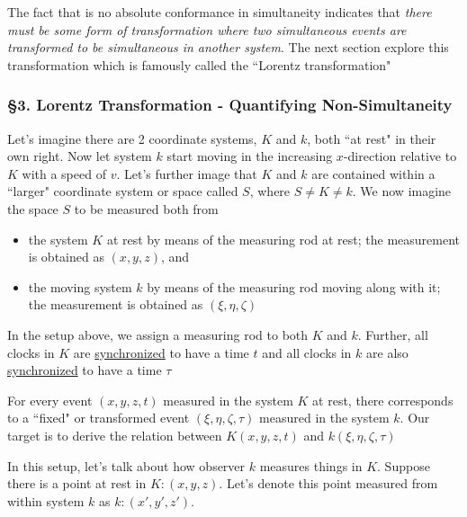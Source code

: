 The fact that is no absolute conformance in simultaneity indicates that \textit{there must be some form of
transformation where two simultaneous events are transformed to be simultaneous in another system}. The next section
explore this transformation which is famously called the ``Lorentz transformation"

\subsubsection{\hfil \S3. Lorentz Transformation - Quantifying Non-Simultaneity \hfil}

\begin{tcolorbox}[
    breakable,
    enhanced,
    arc=3mm,
    boxrule=1.5mm,
    boxsep=1.5mm,
    colback=yellow!20!white,
    colframe=blue,
    borderline={1mm}{1mm}{white},
    borderline={1mm}{2mm}{red}
]
    Let's imagine there are 2 coordinate systems, $K$ and $k$, both ``at rest" in their own right. Now let system $k$
    start moving in the increasing $x$-direction relative to $K$ with a speed of $v$. Let's further image that $K$ and
    $k$ are contained within a ``larger" coordinate system or space called $S$, where $S \ne K \ne k$. We now imagine
    the space $S$ to be measured both from

    \begin{itemize}
        \item the system $K$ at rest by means of the measuring rod at rest; the measurement is obtained as $(x, y, z)$,
              and
        \item the moving system $k$ by means of the measuring rod moving along with it; the measurement is obtained as
              $(\xi, \eta, \zeta)$
    \end{itemize}

    In the setup above, we assign a measuring rod to both $K$ and $k$. Further, all clocks in $K$ are
    \hyperref[def:synchronism]{synchronized} to have a time $t$ and all clocks in $k$ are also
    \hyperref[def:synchronism]{synchronized} to have a time $\tau$

    For every event $(x, y, z, t)$ measured in the system $K$ at rest, there corresponds to a ``fixed" or transformed
    event $(\xi, \eta, \zeta, \tau)$ measured in the system $k$. Our target is to derive the relation between
    $K(x, y, z, t)$ and $k(\xi, \eta, \zeta, \tau)$
\end{tcolorbox}

In this setup, let's talk about how observer $k$ measures things in $K$. Suppose there is a point at rest in
$K: (x, y, z)$. Let's denote this point measured from within system $k$ as $k: (x', y', z')$.

